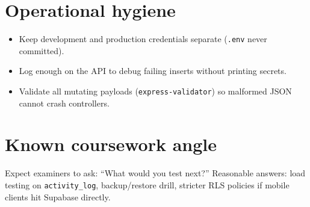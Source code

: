 \section{Operational hygiene}
\begin{itemize}[leftmargin=*]
  \item Keep development and production credentials separate (\texttt{.env} never committed).

  \item Log enough on the API to debug failing inserts without printing secrets.

  \item Validate all mutating payloads (\texttt{express-validator}) so malformed JSON cannot crash controllers.

\end{itemize}

\section{Known coursework angle}
Expect examiners to ask: ``What would you test next?'' Reasonable answers: load testing on \texttt{activity\_log}, backup/restore drill, stricter RLS policies if mobile clients hit Supabase directly.
